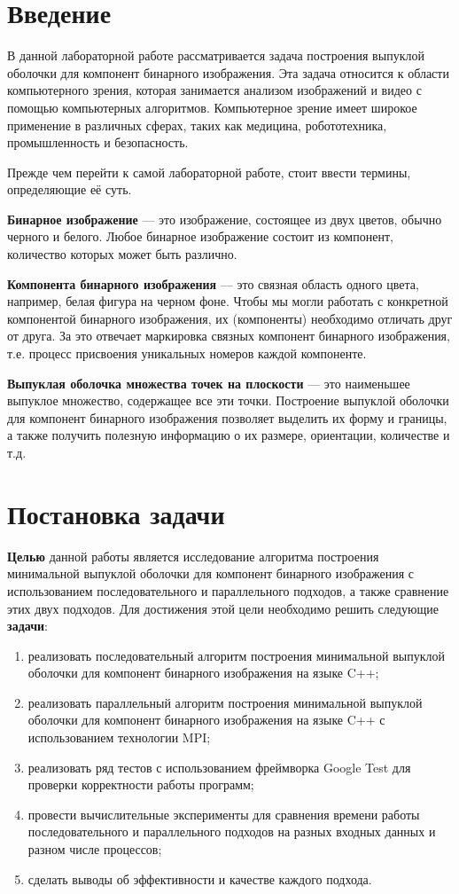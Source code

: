 \documentclass[a4paper, 12pt]{extarticle}
\newcommand{\n}{\par}
\begin{document}
	\section{Введение}
	В данной лабораторной работе рассматривается задача построения выпуклой оболочки для компонент бинарного изображения. Эта задача относится к области компьютерного зрения, которая занимается анализом изображений и видео с помощью компьютерных алгоритмов. Компьютерное зрение имеет широкое применение в различных сферах, таких как медицина, робототехника, промышленность и безопасность.\n
	Прежде чем перейти к самой лабораторной работе, стоит ввести термины, определяющие её суть.\n
	\textbf{Бинарное изображение} — это изображение, состоящее из двух цветов, обычно черного и белого. Любое бинарное изображение состоит из компонент, количество которых может быть различно.\n
	\textbf{Компонента бинарного изображения} — это связная область одного цвета, например, белая фигура на черном фоне. Чтобы мы могли работать с конкретной компонентой бинарного изображения, их (компоненты) необходимо отличать друг от друга. За это отвечает маркировка связных компонент бинарного изображения, т.е. процесс присвоения уникальных номеров каждой компоненте.\n
	\textbf{Выпуклая оболочка множества точек на плоскости} — это наименьшее выпуклое множество, содержащее все эти точки. Построение выпуклой оболочки для компонент бинарного изображения позволяет выделить их форму и границы, а также получить полезную информацию о их размере, ориентации, количестве и т.д.
	\newpage
	\section{Постановка задачи}
	\textbf{Целью} данной работы является исследование алгоритма построения минимальной выпуклой оболочки для компонент бинарного изображения с использованием последовательного и параллельного подходов, а также сравнение этих двух подходов. Для достижения этой цели необходимо решить следующие \textbf{задачи}:
	\begin{enumerate}
		\item реализовать последовательный алгоритм построения минимальной выпуклой оболочки для компонент бинарного изображения на языке C++;
		\item реализовать параллельный алгоритм построения минимальной выпуклой оболочки для компонент бинарного изображения на языке C++ с использованием технологии MPI;
		\item реализовать ряд тестов с использованием фреймворка Google Test для проверки корректности работы программ;
		\item провести вычислительные эксперименты для сравнения времени работы последовательного и параллельного подходов на разных входных данных и разном числе процессов;
		\item сделать выводы об эффективности и качестве каждого подхода.
	\end{enumerate}
	\newpage
\end{document}
